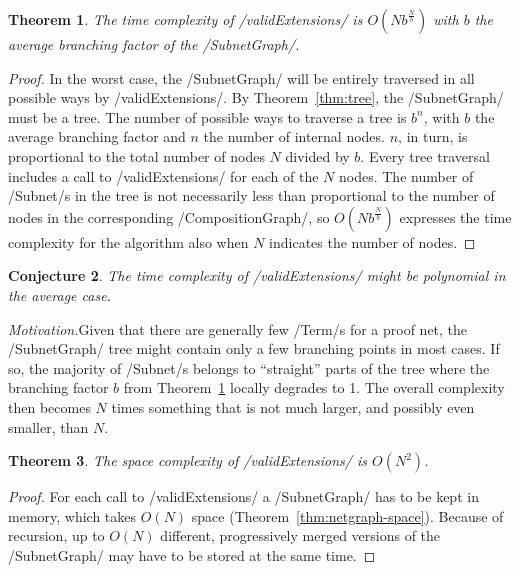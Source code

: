 \documentclass[12pt,a4paper]{article}
\newtheorem{theorem}{Theorem}
\newtheorem{conjecture}[theorem]{Conjecture}
\begin{document}
\begin{theorem}\label{thm:exponential}
    The time complexity of \hs/validExtensions/ is $O(Nb^{\frac{N}{b}})$ with $b$ the average branching factor of the \hs/SubnetGraph/.
\end{theorem}
\begin{proof}
    In the worst case, the \hs/SubnetGraph/ will be entirely traversed in all possible ways by \hs/validExtensions/. By Theorem~\ref{thm:tree}, the \hs/SubnetGraph/ must be a tree. The number of possible ways to traverse a tree is $b^n$, with $b$ the average branching factor and $n$ the number of internal nodes. $n$, in turn, is proportional to the total number of nodes $N$ divided by $b$. Every tree traversal includes a call to \hs/validExtensions/ for each of the $N$ nodes. The number of \hs/Subnet/s in the tree is not necessarily less than proportional to the number of nodes in the corresponding \hs/CompositionGraph/, so $O(Nb^{\frac{N}{b}})$ expresses the time complexity for the algorithm also when $N$ indicates the number of nodes.
\end{proof}

\begin{conjecture}\label{cnj:polynomial}
    The time complexity of \hs/validExtensions/ might be polynomial in the average case.
\end{conjecture}
\noindent\emph{Motivation.}\hspace{6pt}Given that there are generally few \hs/Term/s for a proof net, the \hs/SubnetGraph/ tree might contain only a few branching points in most cases. If so, the majority of \hs/Subnet/s belongs to ``straight'' parts of the tree where the branching factor $b$ from Theorem~\ref{thm:exponential} locally degrades to 1. The overall complexity then becomes $N$ times something that is not much larger, and possibly even smaller, than $N$.

\begin{theorem}\label{thm:extend-space}
    The space complexity of \hs/validExtensions/ is $O(N^2)$.
\end{theorem}
\begin{proof}
    For each call to \hs/validExtensions/ a \hs/SubnetGraph/ has to be kept in memory, which takes $O(N)$ space (Theorem~\ref{thm:netgraph-space}). Because of recursion, up to $O(N)$ different, progressively merged versions of the \hs/SubnetGraph/ may have to be stored at the same time.
\end{proof}
\end{document}
